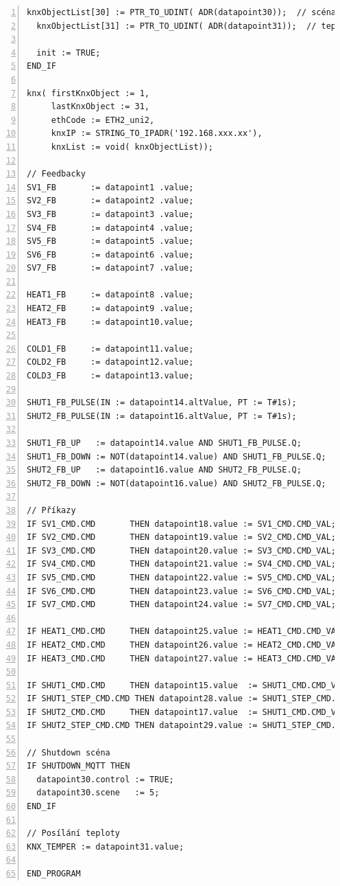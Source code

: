 \begin{lstlisting}[language=ST, breaklines=true, numbers=left, numberstyle=\small, numbersep=10pt, frame=single, basicstyle=\ttfamily\small, caption={Program komunikace mezi PLC a KNX}, label={lst:prgKNXComm}]
  knxObjectList[30] := PTR_TO_UDINT( ADR(datapoint30));  // scéna
  knxObjectList[31] := PTR_TO_UDINT( ADR(datapoint31));  // teplota

  init := TRUE;
END_IF

knx( firstKnxObject := 1,
     lastKnxObject := 31,
     ethCode := ETH2_uni2,
     knxIP := STRING_TO_IPADR('192.168.xxx.xx'),
     knxList := void( knxObjectList));

// Feedbacky
SV1_FB       := datapoint1 .value;
SV2_FB       := datapoint2 .value;
SV3_FB       := datapoint3 .value;
SV4_FB       := datapoint4 .value;
SV5_FB       := datapoint5 .value;
SV6_FB       := datapoint6 .value;
SV7_FB       := datapoint7 .value;

HEAT1_FB     := datapoint8 .value;
HEAT2_FB     := datapoint9 .value;
HEAT3_FB     := datapoint10.value;

COLD1_FB     := datapoint11.value;
COLD2_FB     := datapoint12.value;
COLD3_FB     := datapoint13.value;

SHUT1_FB_PULSE(IN := datapoint14.altValue, PT := T#1s);
SHUT2_FB_PULSE(IN := datapoint16.altValue, PT := T#1s);

SHUT1_FB_UP   := datapoint14.value AND SHUT1_FB_PULSE.Q;
SHUT1_FB_DOWN := NOT(datapoint14.value) AND SHUT1_FB_PULSE.Q;
SHUT2_FB_UP   := datapoint16.value AND SHUT2_FB_PULSE.Q;
SHUT2_FB_DOWN := NOT(datapoint16.value) AND SHUT2_FB_PULSE.Q;

// Příkazy
IF SV1_CMD.CMD       THEN datapoint18.value := SV1_CMD.CMD_VAL; END_IF;
IF SV2_CMD.CMD       THEN datapoint19.value := SV2_CMD.CMD_VAL; END_IF;
IF SV3_CMD.CMD       THEN datapoint20.value := SV3_CMD.CMD_VAL; END_IF;
IF SV4_CMD.CMD       THEN datapoint21.value := SV4_CMD.CMD_VAL; END_IF;
IF SV5_CMD.CMD       THEN datapoint22.value := SV5_CMD.CMD_VAL; END_IF;
IF SV6_CMD.CMD       THEN datapoint23.value := SV6_CMD.CMD_VAL; END_IF;
IF SV7_CMD.CMD       THEN datapoint24.value := SV7_CMD.CMD_VAL; END_IF;

IF HEAT1_CMD.CMD     THEN datapoint25.value := HEAT1_CMD.CMD_VAL; END_IF;
IF HEAT2_CMD.CMD     THEN datapoint26.value := HEAT2_CMD.CMD_VAL; END_IF;
IF HEAT3_CMD.CMD     THEN datapoint27.value := HEAT3_CMD.CMD_VAL; END_IF;

IF SHUT1_CMD.CMD     THEN datapoint15.value  := SHUT1_CMD.CMD_VAL; END_IF;
IF SHUT1_STEP_CMD.CMD THEN datapoint28.value := SHUT1_STEP_CMD.CMD_VAL; END_IF;
IF SHUT2_CMD.CMD     THEN datapoint17.value  := SHUT1_CMD.CMD_VAL; END_IF;
IF SHUT2_STEP_CMD.CMD THEN datapoint29.value := SHUT1_STEP_CMD.CMD_VAL; END_IF;

// Shutdown scéna
IF SHUTDOWN_MQTT THEN
  datapoint30.control := TRUE;
  datapoint30.scene   := 5;
END_IF

// Posílání teploty
KNX_TEMPER := datapoint31.value;

END_PROGRAM
\end{lstlisting}